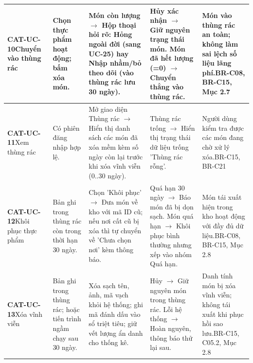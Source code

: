 \documentclass[10pt,a4paper]{article}
\begin{document}
\begin{longtable}{|p{2.1cm}|p{2.3cm}|p{3.5cm}|p{3.8cm}|p{3.0cm}|}
\hline
\textbf{CAT-UC-10}\newline Chuyển vào thùng rác & Chọn thực phẩm hoạt động; bấm xóa món. & Món còn lượng $\to$ Hộp thoại hỏi rõ: Hỏng ngoài đời (sang UC-25) hay Nhập nhầm/bỏ theo dõi (vào thùng rác lưu 30 ngày). & Hủy xác nhận $\to$ Giữ nguyên trạng thái món. Món đã hết lượng (=0) $\to$ Chuyển thẳng vào thùng rác. & Món vào thùng rác an toàn; không làm sai lệch số liệu lãng phí.\newline BR-C08, BR-C15, Mục 2.7 \\
\hline
\textbf{CAT-UC-11}\newline Xem thùng rác & Có phiên đăng nhập hợp lệ. & Mở giao diện Thùng rác $\to$ Hiển thị danh sách các món đã xóa mềm kèm số ngày còn lại trước khi xóa vĩnh viễn (0..30 ngày). & Thùng rác trống $\to$ Hiển thị trạng thái dữ liệu trống 'Thùng rác rỗng'. & Người dùng kiểm tra được các món đang chờ xử lý xóa.\newline BR-C15, BR-C21 \\
\hline
\textbf{CAT-UC-12}\newline Khôi phục thực phẩm & Bản ghi trong thùng rác còn trong thời hạn 30 ngày. & Chọn 'Khôi phục' $\to$ Đưa món về kho với mã ID cũ; nếu nơi cất cũ bị xóa thì tự chuyển về 'Chưa chọn nơi' kèm thông báo. & Quá hạn 30 ngày $\to$ Báo món đã bị dọn sạch. Món quá hạn $\to$ Khôi phục bình thường nhưng xếp vào nhóm Quá hạn. & Món tái xuất hiện trong kho hoạt động với đầy đủ dữ liệu.\newline BR-C08, BR-C15, Mục 2.8 \\
\hline
\textbf{CAT-UC-13}\newline Xóa vĩnh viễn & Bản ghi trong thùng rác; hoặc tiến trình ngầm chạy sau 30 ngày. & Xóa sạch tên, ảnh, mã vạch khỏi hệ thống; ghi mã đánh dấu vào sổ triệt tiêu; giữ vết lượng ẩn danh cho thống kê. & Hủy $\to$ Giữ nguyên món trong thùng rác. Lỗi hệ thống $\to$ Hoàn nguyên, thông báo thử lại sau. & Danh tính món bị xóa vĩnh viễn; không tái xuất khi phục hồi sao lưu.\newline BR-C15, C05.2, Mục 2.8 \\
\hline


\end{longtable}
\end{document}
